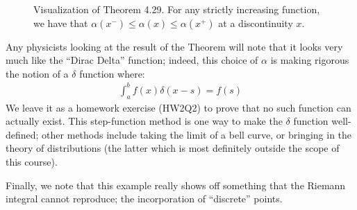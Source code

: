 \begin{figure}[htbp]
    \centering
    
    \caption{Visualization of Theorem 4.29. For any strictly increasing function, we have that $\alpha(x^-) \leq \alpha(x) \leq \alpha(x^+)$ at a discontinuity $x$.}
    \label{fig32}
\end{figure}
Any physicists looking at the result of the Theorem will note that it looks very much like the ``Dirac Delta'' function; indeed, this choice of $\alpha$ is making rigorous the notion of a $\delta$ function where:
\begin{align*}
    \int_a^b f(x)\delta(x - s) = f(s)
\end{align*}
We leave it as a homework exercise (HW2Q2) to prove that no such function can actually exist. This step-function method is one way to make the $\delta$ function well-defined; other methods include taking the limit of a bell curve, or bringing in the theory of distributions (the latter which is most definitely outside the scope of this course).

Finally, we note that this example really shows off something that the Riemann integral cannot reproduce; the incorporation of ``discrete'' points.

